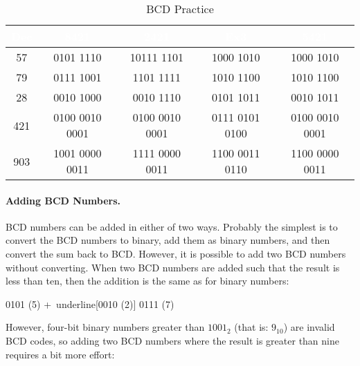 \begin{table}[H]
  \sffamily
  \newcommand{\head}[1]{\textcolor{white}{\textbf{#1}}}    
  \begin{center}
    {\small         
      \begin{tabular}{ c c c c c } 
        \hline
        \rowcolor{black!75}
        {\head{Dec}} & {\head{8421}} & \head{2421} 
        & \head{Ex3} & \head{5421} \\
        \hline    
        57  & 0101 1110      & 10111 1101     
            & 1000 1010      & 1000 1010 \\
        79  & 0111 1001      & 1101 1111      
            & 1010 1100      & 1010 1100 \\
        
        28  & 0010 1000      & 0010 1110      
            & 0101 1011      & 0010 1011 \\
        421 & 0100 0010 0001 & 0100 0010 0001 
            & 0111 0101 0100 & 0100 0010 0001 \\
        
        903 & 1001 0000 0011 & 1111 0000 0011 
            & 1100 0011 0110 & 1100 0000 0011 \\
        \hline  
      \end{tabular}
    }  %
  \end{center}
  \caption{BCD Practice}
  \label{MO:tab:bcd_practice}
\end{table}

\paragraph{Adding BCD Numbers.} \ac{BCD} numbers can be added in either of two ways. Probably the simplest is to convert the \ac{BCD} numbers to binary, add them as binary numbers, and then convert the sum back to \ac{BCD}. However, it is possible to add two \ac{BCD} numbers without converting. When two \ac{BCD} numbers are added such that the result is less than ten, then the addition is the same as for binary numbers:

\begin{binDisp}[commandchars=~\[\]]
     0101  (5)
    +~underline[0010  (2)]
     0111  (7)
\end{binDisp}

However, four-bit binary numbers greater than $ 1001_2 $ (that is: $ 9_{10} $) are invalid \ac{BCD} codes, so adding two \ac{BCD} numbers where the result is greater than nine requires a bit more effort:

